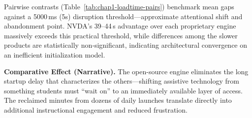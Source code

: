 Pairwise contrasts (Table~\ref{tab:chap1-loadtime-pairs}) benchmark mean gaps against a 5000\,ms (5s) disruption threshold—approximate attentional shift and abandonment point. NVDA’s 39–44\,s advantage over each proprietary engine massively exceeds this practical threshold, while differences among the slower products are statistically non‑significant, indicating architectural convergence on an inefficient initialization model.

\noindent\textbf{Comparative Effect (Narrative).} The open-source engine eliminates the long startup delay that characterizes the others—shifting assistive technology from something students must “wait on” to an immediately available layer of access. The reclaimed minutes from dozens of daily launches translate directly into additional instructional engagement and reduced frustration.

